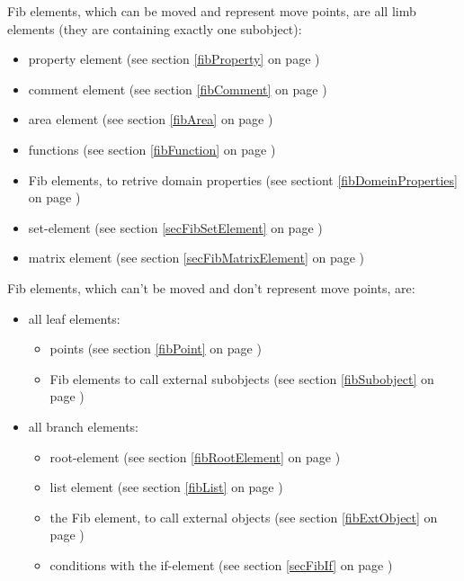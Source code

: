 \bigskip\noindent
Fib elements, which can be moved and represent move points, are all limb elements (they are containing exactly one subobject):
\begin{itemize}
 \item property element (see section \ref{fibProperty} on page \pageref{fibProperty})
 \item comment element (see section \ref{fibComment} on page \pageref{fibComment})
 \item area element (see section \ref{fibArea} on page \pageref{fibArea})
 \item functions (see section \ref{fibFunction} on page \pageref{fibFunction})
 \item Fib elements, to retrive domain properties (see sectiont \ref{fibDomeinProperties} on page \pageref{fibDomeinProperties})
 \item set-element (see section \ref{secFibSetElement} on page \pageref{secFibSetElement})
 \item matrix element (see section \ref{secFibMatrixElement} on page \pageref{secFibMatrixElement})
\end{itemize}

\bigskip\noindent
Fib elements, which can't be moved and don't represent move points, are:
\begin{itemize}
 \item all leaf elements:
 \begin{itemize}
  \item points (see section \ref{fibPoint} on page \pageref{fibPoint})
  \item Fib elements to call external subobjects (see section \ref{fibSubobject} on page \pageref{fibSubobject})
 \end{itemize}
 \item all branch elements:
 \begin{itemize}
  \item root-element (see section \ref{fibRootElement} on page \pageref{fibRootElement})
  \item list element (see section \ref{fibList} on page \pageref{fibList})
  \item the Fib element, to call external objects (see section \ref{fibExtObject} on page \pageref{fibExtObject})
  \item conditions with the if-element (see section \ref{secFibIf} on page \pageref{secFibIf})
 \end{itemize}
\end{itemize}

